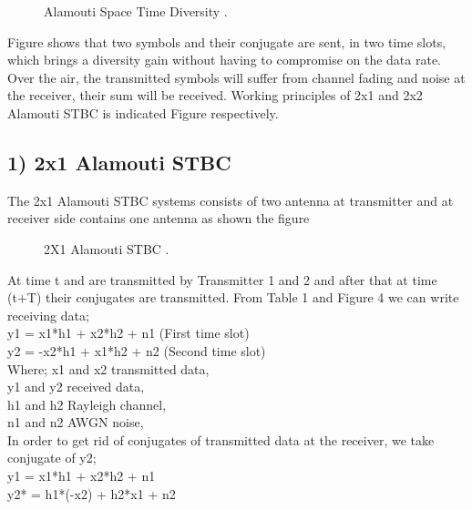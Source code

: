 \documentclass[12pt]{report}
\begin{document}
\begin{figure}[!hbt]
		\begin{center}
		\caption{ Alamouti Space Time Diversity .}
		\label{fig:tf_plot}
		\end{center}
	\end{figure}
Figure shows that two symbols and their conjugate are
sent, in two time slots, which brings a diversity gain
without having to compromise on the data rate. Over the
air, the transmitted symbols will suffer from channel
fading and noise at the receiver, their sum will be
received. Working principles of 2x1 and 2x2 Alamouti
STBC is indicated Figure respectively.
\subsection*{1) 2x1 Alamouti STBC}
The 2x1 Alamouti STBC systems consists of two antenna
at transmitter and at receiver side contains one antenna as
shown the figure
\begin{figure}[!hbt]
\begin{center}
		\caption{2X1 Alamouti STBC  .}
		\label{fig:tf_plot}
		\end{center}
	\end{figure}
At time t and are transmitted by Transmitter
1 and 2 and after that at time (t+T) their conjugates are
transmitted.
From Table 1 and Figure 4 we can write receiving data;\\
y1 = x1*h1 + x2*h2 + n1  (First time slot) \\
y2 = -x2*h1 + x1*h2 + n2  (Second time slot) \\
Where;
x1 and x2 transmitted data,\\
y1 and y2 received data,\\
h1 and h2 Rayleigh channel,\\
n1 and n2 AWGN noise,\\
In order to get rid of conjugates of transmitted data at the
receiver, we take conjugate of y2;\\
y1 = x1*h1 + x2*h2 + n1\\
y2* = h1*(-x2) + h2*x1 + n2
\end{document}
